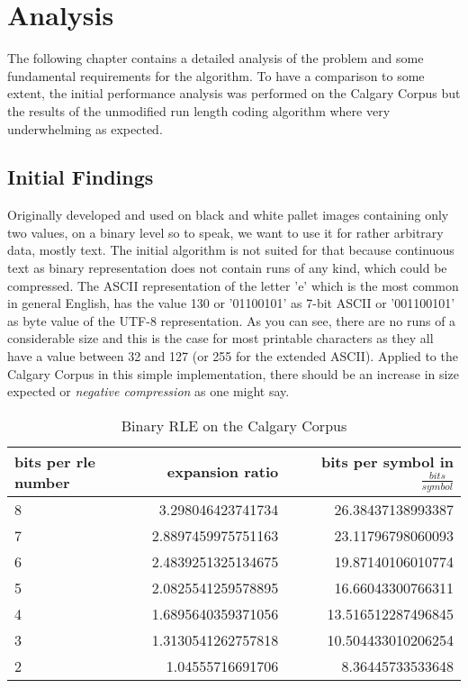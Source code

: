 
\chapter{Analysis}
\label{ch:Analysis}

\par{
The following chapter contains a detailed analysis of the problem and some fundamental requirements for the algorithm. To have a comparison to some extent, the initial performance analysis was performed on the Calgary Corpus but the results of the unmodified run length coding algorithm where very underwhelming as expected.
}

\section{Initial Findings}
\label{ch:Analysis:sec:Initial Findings}
\par{
 Originally developed and used on black and white pallet images containing only two values, on a binary level so to speak, we want to use it for rather arbitrary data, mostly text. The initial algorithm is not suited for that because continuous text as binary representation does not contain runs of any kind, which could be compressed. The ASCII representation of the letter 'e' which is the most common in general English, has the value 130 or '01100101' as 7-bit ASCII or '001100101' as byte value of the UTF-8 representation. As you can see, there are no runs of a considerable size and this is the case for most printable characters as they all have a value between 32 and 127 (or 255 for the extended ASCII). Applied to the Calgary Corpus in this simple implementation, there should be an increase in size expected or \textit{negative compression} as one might say.
}

\begin{table}[h]
	\centering
	\begin{tabular}{l|r|r}
		\label{tab:t4 simple run length eval}
		
		bits per rle number &  expansion ratio & bits per symbol in $\frac{bits}{symbol}$\\
		\hline
		8 & 3.298046423741734& 26.38437138993387 \\
		7 & 2.8897459975751163& 23.11796798060093\\
		6 & 2.4839251325134675& 19.87140106010774 \\
		5 & 2.0825541259578895 & 16.66043300766311\\
		4 & 1.6895640359371056 & 13.516512287496845\\
		3 & 1.3130541262757818 & 10.504433010206254\\
		2 & 1.04555716691706 & 8.36445733533648 \\
	\end{tabular}
	\caption{Binary RLE on the Calgary Corpus}
\end{table}

